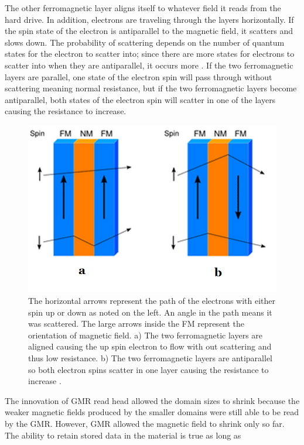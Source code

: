 \documentclass[ notitlepage, numerical, 11pt]{revtex4-1} %
\begin{document}
The other ferromagnetic layer aligns itself to whatever field it reads from the hard drive. In addition, electrons are traveling through the layers horizontally. If the spin state of the electron is antiparallel to the magnetic field, it scatters and slows down. The probability of scattering depends on the number of quantum states for the electron to scatter into; since there are more states for electrons to scatter into when they are antiparallel, it occurs more \cite{gmr}. If the two ferromagnetic layers are parallel, one state of the electron spin will pass through without scattering meaning normal resistance, but if the two ferromagnetic layers become antiparallel, both states of the electron spin will scatter in one of the layers causing the resistance to increase.
\begin{figure}[H]
\centerline{\includegraphics[scale=.45]{gmr2.png}}
\caption{The horizontal arrows represent the path of the electrons with either spin up or down as noted on the left. An angle in the path means it was scattered. The large arrows inside the FM represent the orientation of magnetic field. a) The two ferromagnetic layers are aligned causing the up spin electron to flow with out scattering and thus low resistance. b) The two ferromagnetic layers are antiparallel so both electron spins scatter in one layer causing the resistance to increase \cite{gmr}.}
\label{gmr2}
\end{figure}
The innovation of GMR read head allowed the domain sizes to shrink because the weaker magnetic fields produced by the smaller domains were still able to be read by the GMR. However, GMR allowed the magnetic field to shrink only so far. 
The ability to retain stored data in the material is true as long as 
\end{document}

